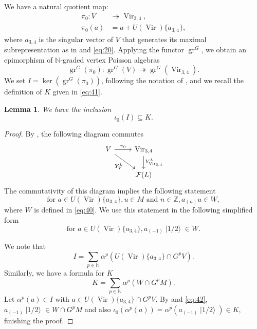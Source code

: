 \documentclass[a4paper, 12pt, reqno]{amsart}
\newtheorem{lemma}[theorem]{Lemma}
\theoremstyle{remark}
\numberwithin{equation}{subsection}
\DeclareMathOperator{\Vir}{Vir}
\DeclareMathOperator{\gr}{gr}
\DeclareMathOperator{\vachalf}{|1/2\rangle}
\begin{document}
We have a natural quotient map:
\begin{align*}
  \pi_0: V &\twoheadrightarrow \Vir_{3, 4}, \\
  \pi_0(a) &= a + U(\Vir)\{a_{3, 4}\},
\end{align*}
where $a_{3, 4}$ is the singular vector of $V$ that generates its maximal subrepresentation as in \cite{andrews_singular_2022} and \eqref{eq:20}.
Applying the functor $\gr^G$, we obtain an epimorphism of $\mathbb{N}$-graded vertex Poisson algebras
\begin{equation*}
  \gr^G(\pi_0): \gr^G(V) \twoheadrightarrow \gr^G(\Vir_{3, 4}).
\end{equation*}
We set $I = \ker(\gr^G(\pi_0))$, following the notation of \cite{andrews_singular_2022}, and we recall the definition of $K$ given in \eqref{eq:41}.

\begin{lemma}
  \label{lmm:33}
  We have the inclusion
  \begin{equation*}
    \iota_0(I) \subseteq K.
  \end{equation*}
\end{lemma}

\begin{proof}
  By , the following diagram commutes
  \begin{equation*}
    \begin{tikzcd}
      V \arrow[r, "\pi_0"] \arrow[rd, "{Y^L_{V}}"'] & {\Vir_{3, 4}} \arrow[d, "{Y^L_{\Vir_{3, 4}}}"] \\
      & {\mathcal{F}(L)}
    \end{tikzcd}
  \end{equation*}
  The commutativity of this diagram implies the following statement
  \begin{equation*}
    \text{for }a \in U(\Vir)\{a_{3, 4}\}, u \in M\text{ and }n \in \mathbb{Z}, a_{(n)}u \in W,
  \end{equation*}
  where $W$ is defined in \eqref{eq:40}.
  We use this statement in the following simplified form
  \begin{equation}
    \label{eq:42}
    \text{for }a \in U(\Vir)\{a_{3, 4}\}, a_{(-1)}\vachalf \in W.
  \end{equation}

  We note that
  \begin{equation*}
    I = \sum_{p \in \mathbb{N}}\alpha^p(U(\Vir)\{a_{3, 4}\} \cap G^pV).
  \end{equation*}
  Similarly, we have a formula for $K$
  \begin{equation*}
    K = \sum_{p \in \mathbb{N}}\alpha^p(W \cap G^pM).
  \end{equation*}
  Let $\alpha^p(a) \in I$ with $a \in U(\Vir)\{a_{3, 4}\} \cap G^pV$.
  By  and \eqref{eq:42}, $a_{(-1)}\vachalf \in W \cap G^pM$ and also $\iota_0(\alpha^p(a)) = \alpha^p(a_{(-1)}\vachalf) \in K$, finishing the proof.
\end{proof}
\end{document}
